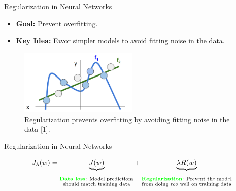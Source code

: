 \documentclass[serif, aspectratio=169]{beamer}
\begin{document}
\begin{frame}{Regularization in Neural Networks}
        \begin{itemize}
            \item \textbf{Goal:} Prevent overfitting.
            \item \textbf{Key Idea:} Favor simpler models to avoid fitting noise in the data.
        \end{itemize}

    \begin{figure}
        \centering
        \includegraphics[width=0.5\textwidth]{pic/Regularization-intuition.png}
        \caption{Regularization prevents overfitting by avoiding fitting noise in the data [1].}
        \label{fig:Regularization-intuition}
    \end{figure}
\end{frame}


\begin{frame}{Regularization in Neural Networks}
    
\begin{equation}
J_\lambda(w) = \underbrace{J(w)}_{{\substack{\vphantom{\text{Prevent the model}} \\ \text{\textcolor{green} {\textbf{Data loss}}: Model predictions} \\ \text{should match training data}}}} + \underbrace{\lambda R(w)}_{{\substack{\vphantom{\text{Prevent the model}} \\ \text{\textcolor{green} {\textbf{Regularization}}: Prevent the model} \\ \text{from doing \textit{too} well on training data}}}}
\end{equation}


\end{frame}
\end{document}
